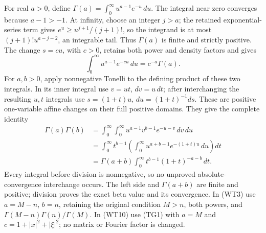 \documentclass[
  11pt,
]{article}
\begin{document}
For real \(a>0\), define \(\Gamma(a)=\int_0^\infty u^{a-1}e^{-u}\,du\).
The integral near zero converges because \(a-1>-1\). At infinity, choose
an integer \(j>a\); the retained exponential-series term gives
\(e^u\geq u^{j+1}/(j+1)!\), so the integrand is at most
\((j+1)!u^{a-j-2}\), an integrable tail. Thus \(\Gamma(a)\) is finite
and strictly positive. The change \(s=cu\), with \(c>0\), retains both
power and density factors and gives \[
 \int_0^\infty u^{a-1}e^{-cu}\,du
       =c^{-a}\Gamma(a).
                                                               \tag{TG1}
\] For \(a,b>0\), apply nonnegative Tonelli to the defining product of
these two integrals. In its inner integral use \(v=ut\), \(dv=u\,dt\);
after interchanging the resulting \(u,t\) integrals use \(s=(1+t)u\),
\(du=(1+t)^{-1}ds\). These are positive one-variable affine changes on
their full positive domains. They give the complete identity \[
 \begin{aligned}
 \Gamma(a)\Gamma(b)
 &=\int_0^\infty\int_0^\infty
                  u^{a-1}v^{b-1}e^{-u-v}\,dv\,du\\
 &=\int_0^\infty t^{b-1}
       \left(\int_0^\infty u^{a+b-1}e^{-(1+t)u}\,du\right)dt\\
 &=\Gamma(a+b)\int_0^\infty t^{b-1}(1+t)^{-a-b}\,dt.
 \end{aligned}                                                  \tag{TG2}
\] Every integral before division is nonnegative, so no unproved
absolute-convergence interchange occurs. The left side and
\(\Gamma(a+b)\) are finite and positive; division proves the exact beta
value and its convergence. In (WT3) use \(a=M-n\), \(b=n\), retaining
the original condition \(M>n\), both powers, and
\(\Gamma(M-n)\Gamma(n)/\Gamma(M)\). In (WT10) use (TG1) with \(a=M\) and
\(c=1+|x|^2+|\xi|^2\); no matrix or Fourier factor is changed.
\end{document}
